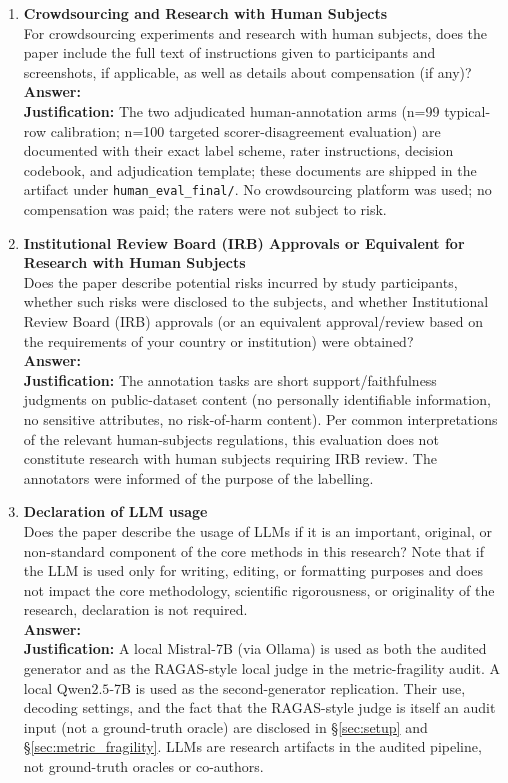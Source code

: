 \begin{enumerate}
\item {\bf Crowdsourcing and Research with Human Subjects}\\
For crowdsourcing experiments and research with human subjects, does
the paper include the full text of instructions given to participants
and screenshots, if applicable, as well as details about compensation
(if any)?
\\\textbf{Answer: \answerYes{}}
\\\textbf{Justification:} The two adjudicated human-annotation arms
(n=99 typical-row calibration; n=100 targeted scorer-disagreement
evaluation) are documented with their exact label scheme, rater
instructions, decision codebook, and adjudication template; these
documents are shipped in the artifact under
\texttt{human\_eval\_final/}. No crowdsourcing platform was used; no
compensation was paid; the raters were not subject to risk.

\item {\bf Institutional Review Board (IRB) Approvals or Equivalent for Research with Human Subjects}\\
Does the paper describe potential risks incurred by study participants,
whether such risks were disclosed to the subjects, and whether
Institutional Review Board (IRB) approvals (or an equivalent approval/review
based on the requirements of your country or institution) were obtained?
\\\textbf{Answer: \answerNA{}}
\\\textbf{Justification:} The annotation tasks are short
support/faithfulness judgments on public-dataset content (no
personally identifiable information, no sensitive attributes, no
risk-of-harm content). Per common interpretations of the relevant
human-subjects regulations, this evaluation does not constitute
research with human subjects requiring IRB review. The annotators
were informed of the purpose of the labelling.

\item {\bf Declaration of LLM usage}\\
Does the paper describe the usage of LLMs if it is an important,
original, or non-standard component of the core methods in this
research? Note that if the LLM is used only for writing, editing, or
formatting purposes and does not impact the core methodology,
scientific rigorousness, or originality of the research, declaration
is not required.
\\\textbf{Answer: \answerYes{}}
\\\textbf{Justification:} A local Mistral-7B (via Ollama) is used as
both the audited generator and as the RAGAS-style local judge in the
metric-fragility audit. A local Qwen$2.5$-7B is used as the
second-generator replication. Their use, decoding settings, and the
fact that the RAGAS-style judge is itself an audit input (not a
ground-truth oracle) are disclosed in \S\ref{sec:setup} and
\S\ref{sec:metric_fragility}. LLMs are research artifacts in the
audited pipeline, not ground-truth oracles or co-authors.

\end{enumerate}
